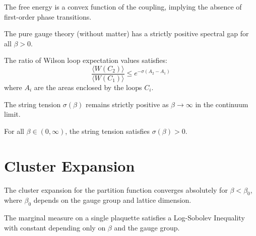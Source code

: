 \begin{theorem}
\label{thm:convex-analytic}
The free energy is a convex function of the coupling, implying the absence of first-order phase transitions.
\end{theorem}

\begin{theorem}
\label{thm:pure-spectral-gap}
The pure gauge theory (without matter) has a strictly positive spectral gap for all $\beta > 0$.
\end{theorem}

\begin{theorem}
\label{thm:ratio-bound}
The ratio of Wilson loop expectation values satisfies:
\begin{equation}
\frac{\langle W(C_2) \rangle}{\langle W(C_1) \rangle} \le e^{-\sigma (A_2 - A_1)}
\end{equation}
where $A_i$ are the areas enclosed by the loops $C_i$.
\end{theorem}

\begin{theorem}
\label{thm:sigma-positive-continuum}
The string tension $\sigma(\beta)$ remains strictly positive as $\beta \to \infty$ in the continuum limit.
\end{theorem}

\begin{theorem}
\label{thm:sigma-positive-all-beta}
For all $\beta \in (0, \infty)$, the string tension satisfies $\sigma(\beta) > 0$.
\end{theorem}

\section{Cluster Expansion}
\label{sec:cluster-expansion}

\begin{theorem}
The cluster expansion for the partition function converges absolutely for $\beta < \beta_0$, where $\beta_0$ depends on the gauge group and lattice dimension.
\end{theorem}

\begin{theorem}
\label{thm:marginal-lsi}
The marginal measure on a single plaquette satisfies a Log-Sobolev Inequality with constant depending only on $\beta$ and the gauge group.
\end{theorem}

